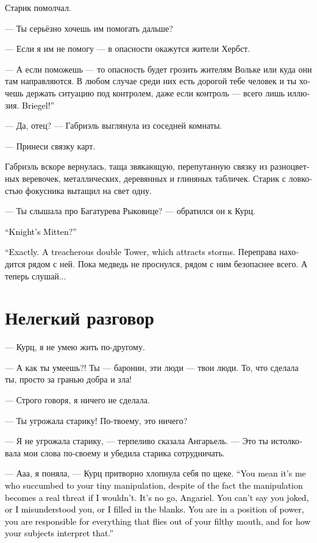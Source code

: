 \documentclass[a4paper,12pt,fleqn]{book}\usepackage{cooltooltips}\usepackage{polyglossia}\setdefaultlanguage[babelshorthands=true]{russian}\setotherlanguage{english}\defaultfontfeatures{Ligatures=TeX,Mapping=tex-text} \usepackage{xcolor}\definecolor{lightgray}{HTML}{bbbbbb}\color{lightgray}\newcommand{\ml}[3]{\textenglish{\textcolor{black}{#3}}}
\begin{document}
Старик помолчал.

--- Ты серьёзно хочешь им помогать дальше?

--- Если я им не помогу --- в опасности окажутся жители Хербст.

--- А если поможешь --- то опасность будет грозить жителям Вольке или куда они там направляются.
В любом случае среди них есть дорогой тебе человек и ты хочешь держать ситуацию под контролем, даже если контроль --- всего лишь иллюзия.
\ml{$0$}
{Бригель!}
{Briegel!''}

--- Да, отец? --- Габриэль выглянула из соседней комнаты.

--- Принеси связку карт.

Габриэль вскоре вернулась, таща звякающую, перепутанную связку из разноцветных веревочек, металлических, деревянных и глиняных табличек.
Старик с ловкостью фокусника вытащил на свет одну.

--- Ты слышала про Багатурева Рыковице? --- обратился он к Курц.

\ml{$0$}
{--- Перчатка Рыцаря?}
{``Knight's Mitten?''}

\ml{$0$}
{--- Именно.}
{``Exactly.}
\ml{$0$}
{Коварная двойная Башня, которая притягивает бури.}
{A treacherous double Tower, which attracts storms.}
Переправа находится рядом с ней.
Пока медведь не проснулся, рядом с ним безопаснее всего.
А теперь слушай...

\section{Нелегкий разговор}

--- Курц, я не умею жить по-другому.

--- А как ты умеешь?!
Ты --- баронин, эти люди --- твои люди.
То, что сделала ты, просто за гранью добра и зла!

--- Строго говоря, я ничего не сделала.

--- Ты угрожала старику!
По-твоему, это ничего?

--- Я не угрожала старику, --- терпеливо сказала Ангарьель.
--- Это ты истолковала мои слова по-своему и убедила старика сотрудничать.

--- Ааа, я поняла, --- Курц притворно хлопнула себя по щеке.
\ml{$0$}
{--- То есть это я поддалась на твою маленькую манипуляцию, с тем нюансом, что если бы я не поддалась, то манипуляция превратилась бы в реальную угрозу.}
{``You mean it's me who succumbed to your tiny manipulation, despite of the fact the manipulation becomes a real threat if I wouldn't.}
\ml{$0$}
{Это так не работает, Ангарьель.}
{It's no go, Angariel.}
\ml{$0$}
{Ты не можешь сказать, что ты пошутила, что я тебя не так поняла, что я додумала твои слова.}
{You can't say you joked, or I misunderstood you, or I filled in the blanks.}
\ml{$0$}
{Ты на позиции силы и несёшь ответственность за всё, что вылетает из твоего поганого рта, и за то, как твои подчинённые это истолковывают.}
{You are in a position of power, you are responsible for everything that flies out of your filthy mouth, and for how your subjects interpret that.''}
\end{document}
